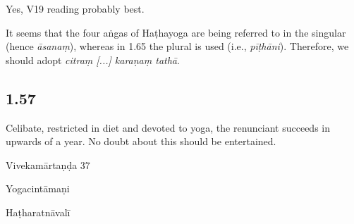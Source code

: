 \begin{ekdosis}
\begin{philcomm}[hp01_056]
Yes, V19 reading probably best.

\begin{versinnote}
\end{versinnote}

It seems that the four aṅgas of Haṭhayoga are being referred to in the singular (hence \emph{āsanaṃ}), whereas in 1.65 the plural is used (i.e., \emph{pīṭhāni}). Therefore, we should adopt \emph{citraṃ [...] karaṇaṃ tathā}.
\end{philcomm}

\subsection*{1.57}
\begin{translation}[hp01_057]
Celibate, restricted in diet and devoted to yoga, the renunciant succeeds in upwards of a year. No doubt about this should be entertained.
\end{translation}

\begin{sources}[hp01_057]
Vivekamārtaṇḍa 37

\begin{versinnote}
\end{versinnote}

\end{sources}

\begin{testimonia}[hp01_057]
Yogacintāmaṇi

\begin{versinnote}
\end{versinnote}

Haṭharatnāvalī

\begin{versinnote}
\end{versinnote}


\end{testimonia}
\end{ekdosis}
